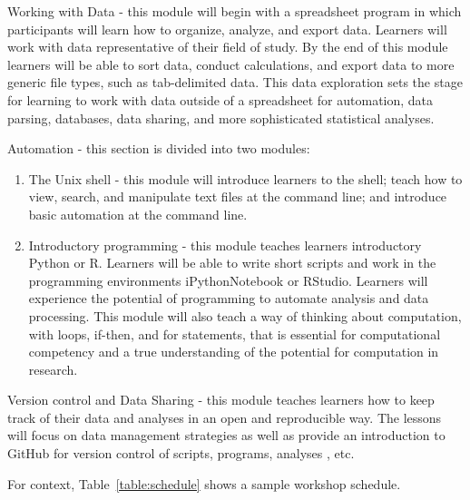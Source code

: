 \documentclass{proposalnsf}
\begin{document}
\begin{compactitem}
\item Working with Data - this module will begin with a spreadsheet program in which participants will learn how to organize, analyze, and export data.  Learners will work with data representative of their field of study.  By the end of this module learners will be able to sort data, conduct calculations, and export data to more generic file types, such as tab-delimited data.  This data exploration sets the stage for learning to work with data outside of a spreadsheet for automation, data parsing, databases, data sharing, and more sophisticated statistical analyses.
\item Automation - this section is divided into two modules:
  \begin{enumerate}
  \item The Unix shell - this module will introduce learners to the shell; teach how to view, search, and manipulate text files at the command line; and introduce basic automation at the command line.
  \item Introductory programming - this module teaches learners introductory Python or R.  Learners will be able to write short scripts and work in the programming environments iPythonNotebook or RStudio.  Learners will experience the potential of programming to automate analysis and data processing.  This module will also teach a way of thinking about computation, with loops, if-then, and for statements, that is essential for computational competency and a true understanding of the potential for computation in research.
  \end{enumerate}
\item Version control and Data Sharing - this module teaches learners how to keep track of their data and analyses in an open and reproducible way.  The lessons will focus on data management strategies as well as provide an introduction to GitHub for version control of scripts, programs, analyses , etc.
\end{compactitem}
%
For context, Table~\ref{table:schedule} shows a sample workshop schedule.
\end{document}
